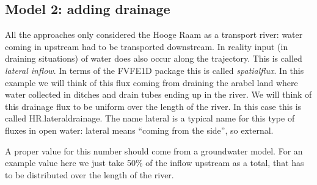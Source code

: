 \documentclass[
]{article}
\begin{document}
\hypertarget{model-2-adding-drainage}{%
\subsection{Model 2: adding drainage}\label{model-2-adding-drainage}}

All the approaches only considered the Hooge Raam as a transport river:
water coming in upstream had to be transported downstream. In reality
input (in draining situations) of water does also occur along the
trajectory. This is called \emph{lateral inflow}. In terms of the FVFE1D
package this is called \emph{spatialflux}. In this example we will think
of this flux coming from draining the arabel land where water collected
in ditches and drain tubes ending up in the river. We will think of this
drainage flux to be uniform over the length of the river. In this case
this is called HR.lateraldrainage. The name lateral is a typical name
for this type of fluxes in open water: lateral means ``coming from the
side'', so external.

A proper value for this number should come from a groundwater model. For
an example value here we just take 50\% of the inflow upstream as a
total, that has to be distributed over the length of the river.
\end{document}
